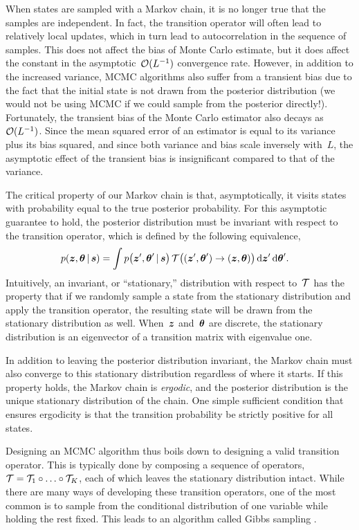 When states are sampled with a Markov chain, it is no longer true that
the samples are independent. In fact, the transition operator will
often lead to relatively local updates, which in turn lead to autocorrelation
in the sequence of samples. This does not affect the bias of Monte
Carlo estimate, but it does affect the constant in the
asymptotic~$\mathcal{O}(L^{-1})$ convergence rate. However, in addition to 
the increased variance, MCMC algorithms also suffer from a transient 
bias due to the fact that the initial state is not drawn from the 
posterior distribution (we would 
not be using MCMC if we could sample from the posterior directly!). Fortunately, the transient bias 
of the Monte Carlo estimator also decays as~$\mathcal{O}(L^{-1})$. Since the 
mean squared error of an estimator is equal to its variance plus its 
 bias squared, and since both variance and bias scale inversely with~$L$, 
the asymptotic effect of the transient bias is insignificant compared to 
that of the variance. 

The critical property of our Markov chain is that, asymptotically, it
visits states with probability equal to the true posterior
probability.  For this asymptotic guarantee to hold, the posterior
distribution must be invariant with respect to the transition
operator, which is defined by the following equivalence,
\begin{align}
  \label{eq:invariance}
  p(\boldsymbol{z}, \boldsymbol{\theta} \,|\, \boldsymbol{s}) 
  &= \int  p \big(\boldsymbol{z}', \boldsymbol{\theta}' \,|\, \boldsymbol{s} \big) \,
    \mathcal{T} \big((\boldsymbol{z}', \boldsymbol{\theta}') \to (\boldsymbol{z}, \boldsymbol{\theta}) \big) \, 
    \mathrm{d}\boldsymbol{z}' \, \mathrm{d}\boldsymbol{\theta}'. 
\end{align}
Intuitively, an invariant, or ``stationary,'' distribution with
respect to~$\mathcal{T}$ has the property that if we randomly sample a state
from the stationary distribution and apply the transition operator,
the resulting state will be drawn from the stationary distribution as
well. When~$\boldsymbol{z}$ and~$\boldsymbol{\theta}$ are discrete, the stationary
distribution is an eigenvector of a transition matrix with eigenvalue
one.

In addition to leaving the posterior distribution invariant, the
Markov chain must also converge to this stationary distribution
regardless of where it starts. If this property holds, the Markov
chain is \emph{ergodic}, and the posterior distribution is the unique
stationary distribution of the chain. One simple sufficient condition
that ensures ergodicity is that the transition probability be strictly
positive for all states.

Designing an MCMC algorithm thus boils down to designing a valid
transition operator. This is typically done by composing a sequence of
operators,~${\mathcal{T} = \mathcal{T}_1 \circ \ldots \circ \mathcal{T}_K}$, each of which
leaves the stationary distribution intact. While there are many ways
of developing these transition operators, one of the most common 
is to sample from the conditional distribution of one variable 
while holding the rest fixed. This leads to an algorithm called 
Gibbs sampling \cite{geman1984stochastic}.

